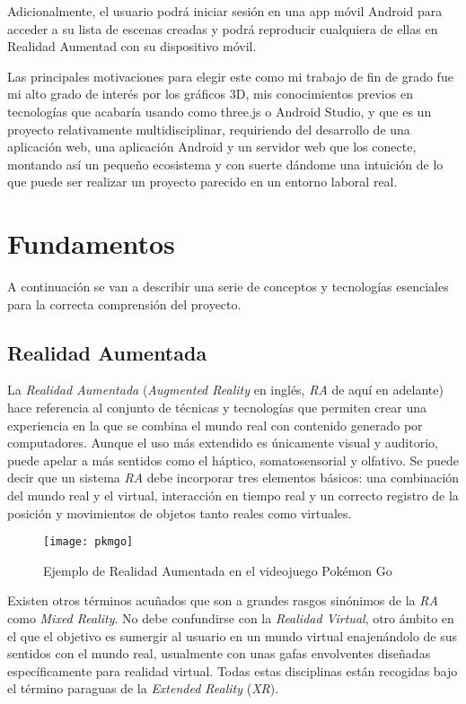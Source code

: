 Adicionalmente, el usuario podrá iniciar sesión en una app móvil Android para acceder a su lista de escenas creadas y podrá reproducir cualquiera de ellas en Realidad Aumentad con su dispositivo móvil.

Las principales motivaciones para elegir este como mi trabajo de fin de grado fue mi alto grado de interés por los gráficos 3D, mis conocimientos previos en tecnologías que acabaría usando como three.js o Android Studio, y que es un proyecto relativamente multidisciplinar, requiriendo del desarrollo de una aplicación web, una aplicación Android y un servidor web que los conecte, montando así un pequeño ecosistema y con suerte dándome una intuición de lo que puede ser realizar un proyecto parecido en un entorno laboral real.

\section{Fundamentos}

A continuación se van a describir una serie de conceptos y tecnologías esenciales para la correcta comprensión del proyecto.

\subsection{Realidad Aumentada}

La \textit{Realidad Aumentada} (\textit{Augmented Reality} en inglés, \textit{RA} de aquí en adelante) hace referencia al conjunto de técnicas y tecnologías que permiten crear una experiencia en la que se combina el mundo real con contenido generado por computadores. Aunque el uso más extendido es únicamente visual y auditorio, puede apelar a más sentidos como el háptico, somatosensorial y olfativo. Se puede decir que un sistema \textit{RA} debe incorporar tres elementos básicos: una combinación del mundo real y el virtual, interacción en tiempo real y un correcto registro de la posición y movimientos de objetos tanto reales como virtuales. 

\begin{figure}[h]
    \centering
    \texttt{[image: pkmgo]}
    \caption[Ejemplo RA]{Ejemplo de Realidad Aumentada en el videojuego Pokémon Go}
\end{figure}

Existen otros términos acuñados que son a grandes rasgos sinónimos de la \textit{RA} como \textit{Mixed Reality}. No debe confundirse con la \textit{Realidad Virtual}, otro ámbito en el que el objetivo es sumergir al usuario en un mundo virtual enajenándolo de sus sentidos con el mundo real, usualmente con unas gafas envolventes diseñadas específicamente para realidad virtual. Todas estas disciplinas están recogidas bajo el término paraguas de la \textit{Extended Reality} (\textit{XR}).

